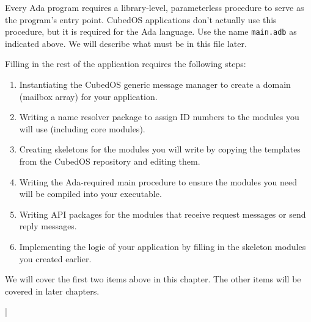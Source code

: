 \documentclass{scrreprt}
\begin{document}
Every Ada program requires a library-level, parameterless procedure to serve as the program's entry point. CubedOS applications don't actually use this procedure, but it is required for the Ada language. Use the name \texttt{main.adb} as indicated above. We will describe what must be in this file later.

Filling in the rest of the application requires the following steps:
\begin{enumerate}
    \item Instantiating the CubedOS generic message manager to create a domain (mailbox array) for your application.
    \item Writing a name resolver package to assign ID numbers to the modules you will use (including core modules).
    \item Creating skeletons for the modules you will write by copying the templates from the CubedOS repository and editing them.
    \item Writing the Ada-required main procedure to ensure the modules you need will be compiled into your executable.
    \item Writing API packages for the modules that receive request messages or send reply messages.
    \item Implementing the logic of your application by filling in the skeleton modules you created earlier.
\end{enumerate}

We will cover the first two items above in this chapter. The other items will be covered in later chapters.

\lstDeleteShortInline|




\end{document}
